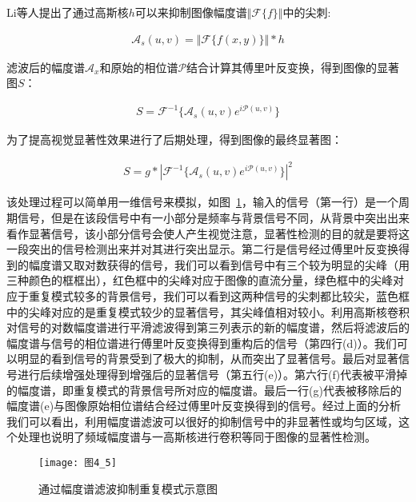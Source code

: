 Li等人提出了通过高斯核$h$可以来抑制图像幅度谱$\Vert \mathcal{F}\{f\}\Vert$中的尖刺:
\begin{linenomath}
\begin{align}
\mathcal{A}_{s}(u,v)=\Vert \mathcal{F}\{f(x,y)\}\Vert\ast h
\label{式4_2}
\end{align}
\end{linenomath}
滤波后的幅度谱$\mathcal{A}_{x}$和原始的相位谱$\mathcal{P}$结合计算其傅里叶反变换，得到图像的显著图$S$：
\begin{linenomath}
\begin{align}
S=\mathcal{F}^{-1}\{\mathcal{A}_{s}(u,v)e^{i\mathcal{P}(u,v)}\}
\label{式4_3}
\end{align}
\end{linenomath}
为了提高视觉显著性效果进行了后期处理，得到图像的最终显著图：
\begin{linenomath}
\begin{align}
S=g*|\mathcal{F}^{-1}\{\mathcal{A}_{s}(u,v)e^{i\mathcal{P}(u,v)}\}|^{2}
\label{式4_4}
\end{align}
\end{linenomath}
该处理过程可以简单用一维信号来模拟，如图~\ref{图4_5}，输入的信号（第一行）是一个周期信号，但是在该段信号中有一小部分是频率与背景信号不同，从背景中突出出来看作显著信号，该小部分信号会使人产生视觉注意，显著性检测的目的就是要将这一段突出的信号检测出来并对其进行突出显示。第二行是信号经过傅里叶反变换得到的幅度谱又取对数获得的信号，我们可以看到信号中有三个较为明显的尖峰（用三种颜色的框框出），红色框中的尖峰对应于图像的直流分量，绿色框中的尖峰对应于重复模式较多的背景信号，我们可以看到这两种信号的尖刺都比较尖，蓝色框中的尖峰对应的是重复模式较少的显著信号，其尖峰值相对较小。利用高斯核卷积对信号的对数幅度谱进行平滑滤波得到第三列表示的新的幅度谱，然后将滤波后的幅度谱与信号的相位谱进行傅里叶反变换得到重构后的信号（第四行(d)）。我们可以明显的看到信号的背景受到了极大的抑制，从而突出了显著信号。最后对显著信号进行后续增强处理得到增强后的显著信号（第五行(e)）。第六行(f)代表被平滑掉的幅度谱，即重复模式的背景信号所对应的幅度谱。最后一行(g)代表被移除后的幅度谱(e)与图像原始相位谱结合经过傅里叶反变换得到的信号。经过上面的分析我们可以看出，利用幅度谱滤波可以很好的抑制信号中的非显著性或均匀区域，这个处理也说明了频域幅度谱与一高斯核进行卷积等同于图像的显著性检测。
\begin{figure}[h]
  \centering
  \texttt{[image: 图4\_5]}
  \caption{通过幅度谱滤波抑制重复模式示意图}   
  \label{图4_5} 
\end{figure}

